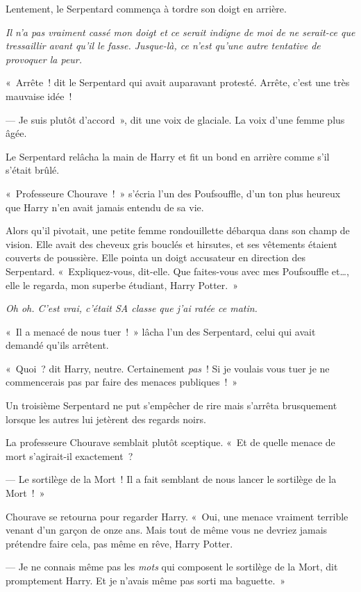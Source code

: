Lentement, le Serpentard commença à tordre son doigt en arrière.

\emph{Il n'a pas vraiment cassé mon doigt et ce serait indigne de moi de ne serait-ce que tressaillir avant qu'il le fasse.
Jusque-là, ce n'est qu'une autre tentative de provoquer la peur.}

«~Arrête~! dit le Serpentard qui avait auparavant protesté. Arrête, c'est une très mauvaise idée~!

--- Je suis plutôt d'accord~», dit une voix de glaciale. La voix d'une femme plus âgée.

Le Serpentard relâcha la main de Harry et fit un bond en arrière comme s'il s'était brûlé.

«~Professeure Chourave~!~» s'écria l'un des Poufsouffle, d'un ton plus heureux que Harry n'en avait jamais entendu de sa vie.

Alors qu'il pivotait, une petite femme rondouillette débarqua dans son champ de vision.
Elle avait des cheveux gris bouclés et hirsutes, et ses vêtements étaient couverts de poussière.
Elle pointa un doigt accusateur en direction des Serpentard.
«~Expliquez-vous, dit-elle.
Que faites-vous avec mes Poufsouffle et…, elle le regarda, mon superbe étudiant, Harry Potter.~»

\emph{Oh oh. C'est vrai, c'était SA classe que j'ai ratée ce matin.}

«~Il a menacé de nous tuer~!~» lâcha l'un des Serpentard, celui qui avait demandé qu'ils arrêtent.

«~Quoi~? dit Harry, neutre.
Certainement \emph{pas}~!
Si je voulais vous tuer je ne commencerais pas par faire des menaces publiques~!~»

Un troisième Serpentard ne put s'empêcher de rire mais s'arrêta brusquement lorsque les autres lui jetèrent des regards noirs.

La professeure Chourave semblait plutôt sceptique.
«~Et de quelle menace de mort s'agirait-il exactement~?

--- Le sortilège de la Mort~! Il a fait semblant de nous lancer le sortilège de la Mort~!~»

Chourave se retourna pour regarder Harry.
«~Oui, une menace vraiment terrible venant d'un garçon de onze ans.
Mais tout de même vous ne devriez jamais prétendre faire cela, pas même en rêve, Harry Potter.

--- Je ne connais même pas les \emph{mots} qui composent le sortilège de la Mort, dit promptement Harry. Et je n'avais même pas sorti ma baguette.~»

